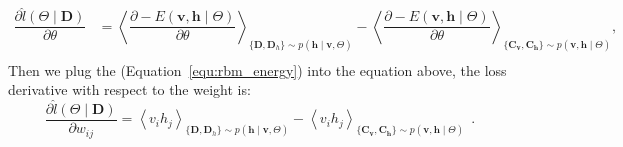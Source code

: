 \begin{equation}
\label{equ:RBM}
\begin{aligned}
\dfrac{\partial \hat{l} (\Theta \mid \mathbf{D})}{\partial \theta} 
& = \left \langle \dfrac{\partial -E(\mathbf{v}, \mathbf{h} \mid \Theta)}{\partial \theta} \right \rangle_{\{\mathbf{D}, \mathbf{D}_h\} \sim p( \mathbf{h} \mid \mathbf{v}, \Theta)} 
- \left \langle \dfrac{\partial -E(\mathbf{v}, \mathbf{h} \mid \Theta)}{\partial \theta} \right \rangle_{\{\mathbf{C_v}, \mathbf{C_h}\} \sim p( \mathbf{v}, \mathbf{h} \mid  \Theta)},  \\
\end{aligned}
\end{equation}
Then we plug the \DIFdelbegin {}\DIFdelend \DIFaddbegin {}\DIFaddend (Equation~\ref{equ:rbm_energy}) into the equation above, the loss derivative with respect to the weight is:
\begin{equation}
\label{equ:RBM_2}
\dfrac{\partial \hat{l} (\Theta \mid \mathbf{D})}{\partial w_{ij}} 
= \left \langle v_i h_j \right \rangle_{\{\mathbf{D}, \mathbf{D}_h\} \sim p( \mathbf{h} \mid \mathbf{v}, \Theta)}
- \left \langle  v_i h_j \right \rangle_{\{\mathbf{C_v}, \mathbf{C_h}\} \sim p( \mathbf{v}, \mathbf{h} \mid  \Theta)}~~. %
\end{equation}
